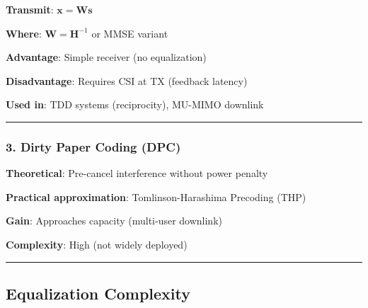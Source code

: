 \textbf{Transmit}: \(\mathbf{x} = \mathbf{W} \mathbf{s}\)

\textbf{Where}: \(\mathbf{W} = \mathbf{H}^{-1}\) or MMSE variant

\textbf{Advantage}: Simple receiver (no equalization)

\textbf{Disadvantage}: Requires CSI at TX (feedback latency)

\textbf{Used in}: TDD systems (reciprocity), MU-MIMO downlink

\begin{center}\rule{0.5\linewidth}{0.5pt}\end{center}

\subsubsection{3. Dirty Paper Coding
(DPC)}\label{dirty-paper-coding-dpc}

\textbf{Theoretical}: Pre-cancel interference without power penalty

\textbf{Practical approximation}: Tomlinson-Harashima Precoding (THP)

\textbf{Gain}: Approaches capacity (multi-user downlink)

\textbf{Complexity}: High (not widely deployed)

\begin{center}\rule{0.5\linewidth}{0.5pt}\end{center}

\subsection{Equalization Complexity}\label{equalization-complexity}

